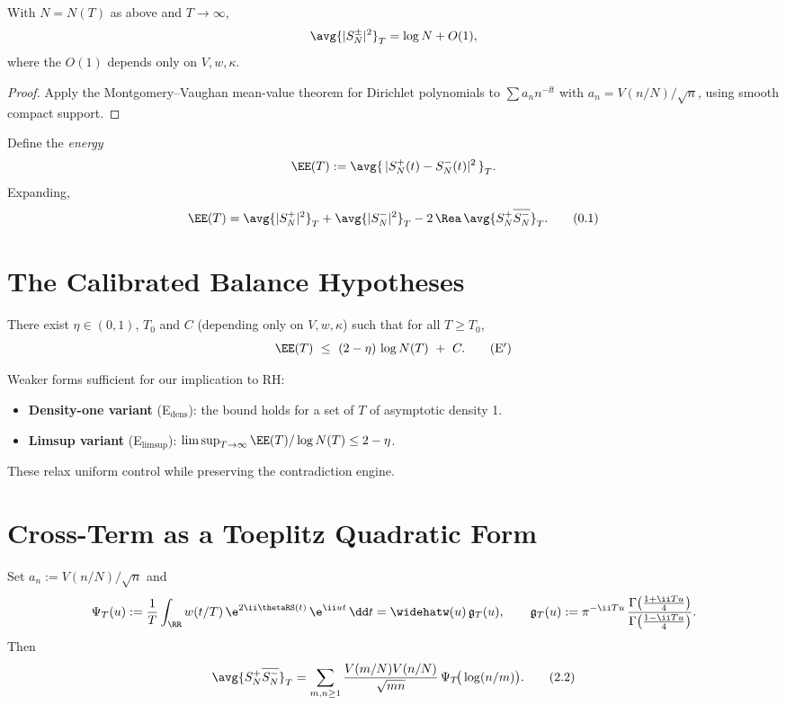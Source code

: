 \begin{lemma}\label{lem:baseline}
With $N=N(T)$ as above and $T\to\infty$,
\[
\avg{\lvert S_N^\pm\rvert^2}_T=\log N + O(1),
\]
where the $O(1)$ depends only on $V,w,\kappa$.
\end{lemma}
\begin{proof}
Apply the Montgomery--Vaughan mean-value theorem for Dirichlet polynomials to $\sum a_n n^{-\ii t}$ with $a_n=V(n/N)/\sqrt{n}$, using smooth compact support.
\end{proof}

Define the \emph{energy}
\begin{equation}
\EE(T):=\avg{\,\lvert S_N^+(t)-S_N^-(t)\rvert^2\,}_T.
\end{equation}
Expanding,
\begin{equation}
\EE(T)=\avg{\lvert S_N^+\rvert^2}_T+\avg{\lvert S_N^-\rvert^2}_T-2\,\Rea\,\avg{ S_N^+\overline{S_N^-}}_T.
\tag{0.1}
\end{equation}

\section{The Calibrated Balance Hypotheses}
\begin{conjecture}[Conjecture E$'$]\label{conj:Eprime}
There exist $\eta\in(0,1)$, $T_0$ and $C$ (depending only on $V,w,\kappa$) such that for all $T\ge T_0$,
\begin{equation}
\EE(T)\ \le\ (2-\eta)\,\log N(T)\ +\ C.
\tag{E$'$}
\end{equation}
\end{conjecture}
Weaker forms sufficient for our implication to RH:
\begin{itemize}[leftmargin=2.25em]
  \item \textbf{Density-one variant} (E$_\mathrm{dens}$): the bound holds for a set of $T$ of asymptotic density 1.
  \item \textbf{Limsup variant} (E$_\mathrm{limsup}$): $\limsup_{T\to\infty} \EE(T)/\log N(T)\le 2-\eta$.
\end{itemize}
These relax uniform control while preserving the contradiction engine.

\section{Cross-Term as a Toeplitz Quadratic Form}
Set $a_n:=V(n/N)/\sqrt{n}$ and
\begin{equation}
\Psi_T(u):=\frac1T\int_{\RR} w(t/T)\,\e^{2\ii\thetaRS(t)}\,\e^{\ii u t}\,\dd t
=\widehatw(u)\,\mathfrak{g}_T(u),\qquad
\mathfrak{g}_T(u):=\pi^{-\ii T u}\,\frac{\Gamma\big(\tfrac{1+\ii T u}{4}\big)}{\Gamma\big(\tfrac{1-\ii T u}{4}\big)}.
\end{equation}
Then
\begin{equation}
\avg{ S_N^+\overline{S_N^-}}_T
=\sum_{m,n\ge1}\frac{V(m/N)V(n/N)}{\sqrt{mn}}\,\Psi_T\!\big(\log(n/m)\big).
\tag{2.2}
\end{equation}

